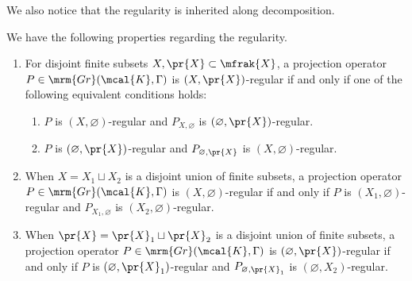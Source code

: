 We also notice that the regularity is inherited along decomposition.
\begin{Lemma}\label{lem:regularity_decomp} We have the following properties regarding the regularity.
\begin{enumerate}\itemsep=0pt
\item[$1.$] 	For disjoint finite subsets $X,\pr{X}\subset\mfrak{X}$, a projection operator $P\in\mrm{Gr}(\mcal{K},\Gamma)$ is $(X,\pr{X})$-regular if and only if one of the following equivalent conditions holds:
		\begin{enumerate}\itemsep=0pt
		\item[$(a)$] 	$P$ is $(X,\varnothing)$-regular and $P_{X,\varnothing}$ is $(\varnothing,\pr{X})$-regular.
		\item[$(b)$] 	$P$ is $(\varnothing,\pr{X})$-regular and $P_{\varnothing,\pr{X}}$ is $(X,\varnothing)$-regular.
		\end{enumerate}
\item[$2.$] 	When $X=X_{1}\sqcup X_{2}$ is a disjoint union of finite subsets, a projection operator $P\in\mrm{Gr}(\mcal{K},\Gamma)$ is $(X,\varnothing)$-regular if and only if $P$ is $(X_{1},\varnothing)$-regular and $P_{X_{1},\varnothing}$ is $(X_{2},\varnothing)$-regular.
\item[$3.$] 	When $\pr{X}=\pr{X}_{1}\sqcup \pr{X}_{2}$ is a disjoint union of finite subsets, a projection operator $P\in\mrm{Gr}(\mcal{K},\Gamma)$ is $(\varnothing,\pr{X})$-regular if and only if $P$ is $(\varnothing,\pr{X}_{1})$-regular and $P_{\varnothing,\pr{X}_{1}}$ is $(\varnothing,X_{2})$-regular.
\end{enumerate}
\end{Lemma}
